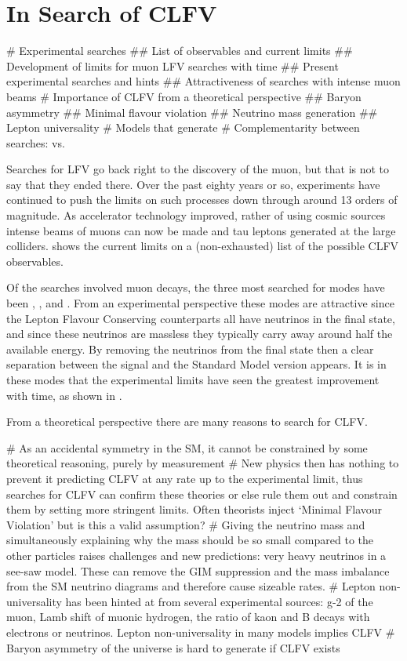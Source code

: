 \section{In Search of \acf{CLFV}}
\begin{easylist}
    # Experimental searches
    ## List of observables and current limits
    ## Development of limits for muon LFV searches with time
    ## Present experimental searches and hints
    ## Attractiveness of searches with intense muon beams
    # Importance of CLFV from a theoretical perspective
    ## Baryon asymmetry
    ## Minimal flavour violation
    ## Neutrino mass generation
    ## Lepton universality
    # Models that generate \mueconv
    # Complementarity between searches: \mueconv vs. \muegamma
\end{easylist}
Searches for \ac{LFV} go back right to the discovery of the muon, but that is not to say that they ended there.
Over the past eighty years or so, experiments have continued to push the limits on such processes down through around 13 orders of magnitude.
As accelerator technology improved, rather of using cosmic sources intense beams of muons can now be made and tau leptons generated at the large colliders.
 shows the current limits on a (non-exhausted) list of the possible \ac{CLFV} observables.

Of the searches involved muon decays, the three most searched for modes have been \mueg, \muec, and \muThreeE.
From an experimental perspective these modes are attractive since the Lepton Flavour Conserving counterparts all have neutrinos in the final state, and since these neutrinos are massless they typically carry away around half the available energy.
By removing the neutrinos from the final state then a clear separation between the signal and the Standard Model version appears.
It is in these modes that the experimental limits have seen the greatest improvement with time, as shown in .

From a theoretical perspective there are many reasons to search for \ac{CLFV}.
\begin{easylist}
# As an accidental symmetry in the SM, it cannot be constrained by some theoretical reasoning, purely by measurement
# New physics then has nothing to prevent it predicting CLFV at any rate up to the experimental limit, thus searches for CLFV can confirm these theories or else rule them out and constrain them by setting more stringent limits.  Often theorists inject `Minimal Flavour Violation' but is this a valid assumption?
# Giving the neutrino mass and simultaneously explaining why the mass should be so small compared to the other particles raises challenges and new predictions: very heavy neutrinos in a see-saw model.  These can remove the GIM suppression and the mass imbalance from the SM neutrino diagrams and therefore cause sizeable rates.
# Lepton non-universality has been hinted at from several experimental sources: g-2 of the muon, Lamb shift of muonic hydrogen, the ratio of kaon and B decays with electrons or neutrinos.  Lepton non-universality in many models implies CLFV
# Baryon asymmetry of the universe is hard to generate if CLFV exists
\end{easylist} 

